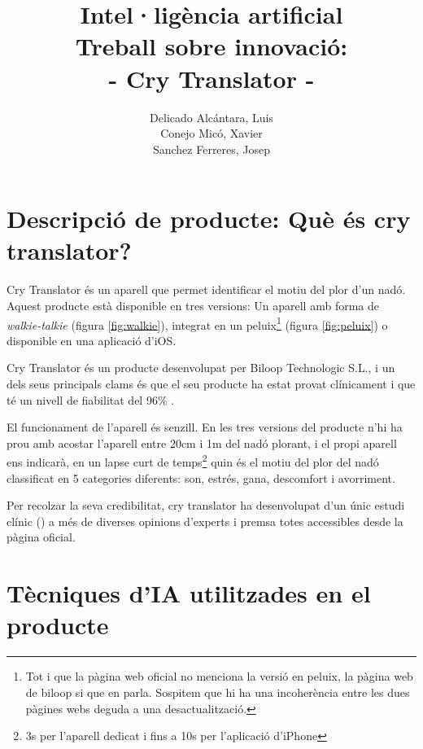 \documentclass[11pt,a4paper]{article}
\author{
  Delicado Alcántara, Luis
  \\
  Conejo Micó, Xavier
  \\
  Sanchez Ferreres, Josep
}
\title{\Huge {Intel·ligència artificial}\\\medskip \huge{Treball sobre innovació:\\ - Cry Translator -}}
\begin{document}
\begin{titlepage}
\clearpage\maketitle
\thispagestyle{empty}
\end{titlepage}

\clearpage

\tableofcontents

\newpage

\section[\textsf{Què és Cry Translator?}]{\textsf{Descripció de producte: Què és cry translator?}}
\label{quees}

Cry Translator \cite{oficial} és un aparell que permet identificar el motiu del plor d'un nadó. Aquest producte està disponible en tres versions: Un aparell amb forma de \emph{walkie-talkie} (figura \ref{fig:walkie}), integrat en un peluix\footnote{Tot i que la pàgina web oficial no menciona la versió en peluix, la pàgina web de biloop si que en parla. Sospitem que hi ha una incoherència entre les dues pàgines webs deguda a una desactualització.} (figura \ref{fig:peluix}) o disponible en una aplicació d'iOS. 

Cry Translator és un producte desenvolupat per Biloop Technologic S.L., i un dels seus principals clams és que el seu producte ha estat provat clínicament \cite{clinic} i que té un nivell de fiabilitat del 96\% \cite{oficial} \cite{elmundo}. 

El funcionament de l'aparell és senzill. En les tres versions del producte n'hi ha prou amb acostar l'aparell entre 20cm i 1m del nadó plorant, i el propi aparell ens indicarà, en un lapse curt de temps\footnote{3s per l'aparell dedicat i fins a 10s per l'aplicació d'iPhone} quin és el motiu del plor del nadó classificat en 5 categories diferents: son, estrés, gana, descomfort i avorriment.

Per recolzar la seva credibilitat, cry translator ha desenvolupat d'un únic estudi clínic (\cite{clinic}) a més de diverses opinions d'experts i premsa totes accessibles desde la pàgina oficial.



\section{\textsf{Tècniques d'IA utilitzades en el producte}}
\label{tecniques}
\end{document}
